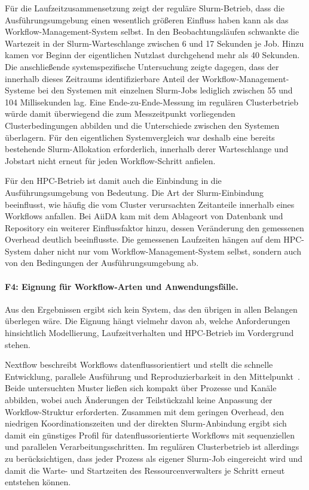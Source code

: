 Für die Laufzeitzusammensetzung zeigt der reguläre Slurm-Betrieb,
dass die Ausführungsumgebung einen wesentlich größeren Einfluss
haben kann als das Workflow-Management-System selbst. In den
Beobachtungsläufen schwankte die Wartezeit in der
Slurm-Warteschlange zwischen 6 und 17 Sekunden je Job. Hinzu kamen
vor Beginn der eigentlichen Nutzlast durchgehend mehr als
40 Sekunden. Die anschließende systemspezifische Untersuchung
zeigte dagegen, dass der innerhalb dieses Zeitraums
identifizierbare Anteil der Workflow-Management-Systeme bei den
Systemen mit einzelnen Slurm-Jobs lediglich zwischen 55 und
104 Millisekunden lag. Eine Ende-zu-Ende-Messung im regulären
Clusterbetrieb würde damit überwiegend die zum Messzeitpunkt
vorliegenden Clusterbedingungen abbilden und die Unterschiede
zwischen den Systemen überlagern. Für den eigentlichen
Systemvergleich war deshalb eine bereits bestehende
Slurm-Allokation erforderlich, innerhalb derer Warteschlange und
Jobstart nicht erneut für jeden Workflow-Schritt anfielen.

Für den HPC-Betrieb ist damit auch die Einbindung in die
Ausführungsumgebung von Bedeutung. Die Art der Slurm-Einbindung beeinflusst, wie häufig die vom Cluster verursachten Zeitanteile innerhalb eines
Workflows anfallen. Bei AiiDA kam mit dem Ablageort von Datenbank
und Repository ein weiterer Einflussfaktor hinzu, dessen
Veränderung den gemessenen Overhead deutlich beeinflusste. Die gemessenen Laufzeiten hängen auf dem HPC-System daher nicht nur
vom Workflow-Management-System selbst, sondern auch von den
Bedingungen der Ausführungsumgebung ab.

\paragraph{F4: Eignung für Workflow-Arten und Anwendungsfälle.}
Aus den Ergebnissen ergibt sich kein System, das den übrigen in
allen Belangen überlegen wäre. Die Eignung hängt vielmehr davon ab,
welche Anforderungen hinsichtlich Modellierung, Laufzeitverhalten
und HPC-Betrieb im Vordergrund stehen.

Nextflow beschreibt Workflows datenflussorientiert und stellt die
schnelle Entwicklung, parallele Ausführung und Reproduzierbarkeit
in den Mittelpunkt~\cite{ditommaso2017nextflow}. Beide untersuchten
Muster ließen sich kompakt über Prozesse und Kanäle abbilden, wobei
auch Änderungen der Teilstückzahl keine Anpassung der
Workflow-Struktur erforderten. Zusammen mit dem geringen Overhead,
den niedrigen Koordinationszeiten und der direkten Slurm-Anbindung
ergibt sich damit ein günstiges Profil für datenflussorientierte
Workflows mit sequenziellen und parallelen Verarbeitungsschritten.
Im regulären Clusterbetrieb ist allerdings zu berücksichtigen, dass
jeder Prozess als eigener Slurm-Job eingereicht wird und damit die
Warte- und Startzeiten des Ressourcenverwalters je Schritt erneut
entstehen können.

